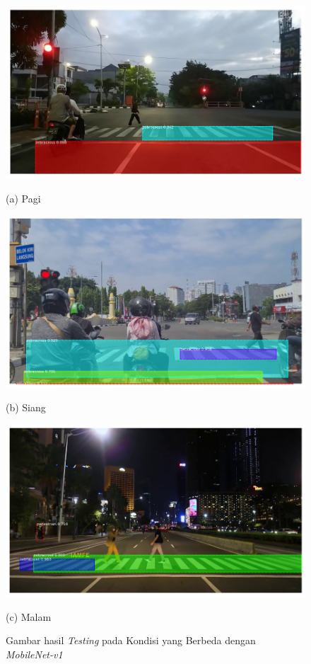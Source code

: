 \documentclass[conference]{IEEEtran}
\begin{document}
	\vspace{1ex}
	\begin{figure}[h]
		\centering
		\begin{minipage}[b]{0.2\textwidth}
			\includegraphics[width=\textwidth]{img/fajar-frame800-mobilenetv1.png}
			\caption*{(a) Pagi}
		\end{minipage}
		\hfill
		\begin{minipage}[b]{0.2\textwidth}
			\includegraphics[width=\textwidth]{img/siang-frame465-mobilenetv1.png}
			\caption*{(b) Siang}
		\end{minipage}
		\hfill
		\begin{minipage}[b]{0.2\textwidth}
			\includegraphics[width=\textwidth]{img/malam-frame180-mobilnetv1.png}
			\caption*{(c) Malam}
		\end{minipage}
		\caption{{Gambar hasil \textit{Testing} pada Kondisi yang Berbeda dengan \textit{MobileNet-v1}}}
		\label{fig:mobilenetv1}
	\end{figure}
\end{document}
